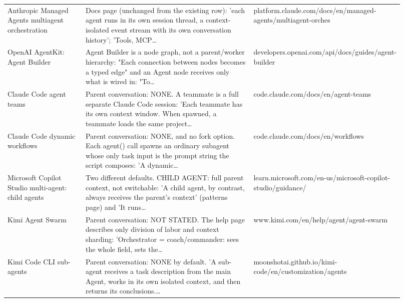 \begin{longtable}{p{0.22\linewidth}p{0.5\linewidth}p{0.2\linewidth}}
Anthropic Managed Agents multiagent orchestratio\allowbreak{}n & Docs page (unchanged from the existing row): 'each agent runs in its own session thread, a context-\allowbreak{}isolated event stream with its own conversation history'; 'Tools, MCP\ldots & platform.\allowbreak{}claude.\allowbreak{}com/\allowbreak{}docs/\allowbreak{}en/\allowbreak{}managed-\allowbreak{}agents/\allowbreak{}multiagent-\allowbreak{}orches \\
OpenAI AgentKit: Agent Builder & Agent Builder is a node graph, not a parent/\allowbreak{}worker hierarchy: "Each connection between nodes becomes a typed edge" and an Agent node receives only what is wired in: "To\ldots & developers.\allowbreak{}openai.\allowbreak{}com/\allowbreak{}api/\allowbreak{}docs/\allowbreak{}guides/\allowbreak{}agent-\allowbreak{}builder \\
Claude Code agent teams & Parent conversation: NONE.\allowbreak{} A teammate is a full separate Claude Code session: 'Each teammate has its own context window.\allowbreak{} When spawned, a teammate loads the same project\ldots & code.\allowbreak{}claude.\allowbreak{}com/\allowbreak{}docs/\allowbreak{}en/\allowbreak{}agent-\allowbreak{}teams \\
Claude Code dynamic workflows & Parent conversation: NONE, and no fork option.\allowbreak{} Each agent() call spawns an ordinary subagent whose only task input is the prompt string the script composes: 'A dynamic\ldots & code.\allowbreak{}claude.\allowbreak{}com/\allowbreak{}docs/\allowbreak{}en/\allowbreak{}workflows \\
Microsoft Copilot Studio multi-\allowbreak{}agent: child agents & Two different defaults.\allowbreak{} CHILD AGENT: full parent context, not switchable: 'A child agent, by contrast, always receives the parent's context' (patterns page) and 'It runs\ldots & learn.\allowbreak{}microsoft.\allowbreak{}com/\allowbreak{}en-\allowbreak{}us/\allowbreak{}microsoft-\allowbreak{}copilot-\allowbreak{}studio/\allowbreak{}guidance/\allowbreak{} \\
Kimi Agent Swarm & Parent conversation: NOT STATED.\allowbreak{} The help page describes only division of labor and context sharding: 'Orchestrator = coach/\allowbreak{}commander: sees the whole field, sets the\ldots & www.\allowbreak{}kimi.\allowbreak{}com/\allowbreak{}en/\allowbreak{}help/\allowbreak{}agent/\allowbreak{}agent-\allowbreak{}swarm \\
Kimi Code CLI sub-\allowbreak{}agents & Parent conversation: NONE by default.\allowbreak{} 'A sub-\allowbreak{}agent receives a task description from the main Agent, works in its own isolated context, and then returns its conclusions.\allowbreak{}\ldots & moonshotai.\allowbreak{}github.\allowbreak{}io/\allowbreak{}kimi-\allowbreak{}code/\allowbreak{}en/\allowbreak{}customizatio\allowbreak{}n/\allowbreak{}agents \\

\end{longtable}
